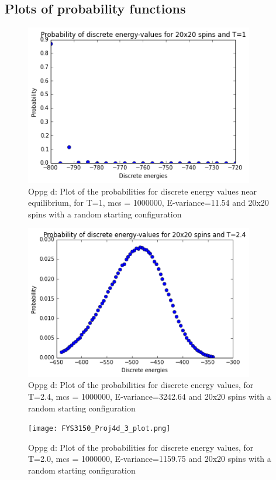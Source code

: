 \documentclass[twocolumn]{article}
\begin{document}
\centering\subsection{Plots of probability functions}

\begin{figure}[H]
  \centering
  \caption{Oppg d: Plot of the probabilities for discrete energy values near equilibrium, for T=1, mcs = 1000000, E-variance=11.54 and 20x20 spins with a random starting configuration}
  \includegraphics[width=10cm]{FYS3150_Proj4d_plot.png}
\end{figure}

\begin{figure}[h!]
  \centering
  \caption{Oppg d: Plot of the probabilities for discrete energy values, for T=2.4, mcs = 1000000, E-variance=3242.64 and 20x20 spins with a random starting configuration}
  \includegraphics[width=10cm]{FYS3150_Proj4d_2_plot.png}
\end{figure}

\begin{figure}[h!]
  \centering
  \caption{Oppg d: Plot of the probabilities for discrete energy values, for T=2.0, mcs = 1000000, E-variance=1159.75 and 20x20 spins with a random starting configuration}
  \texttt{[image: FYS3150\_Proj4d\_3\_plot.png]}
\end{figure}
\end{document}
